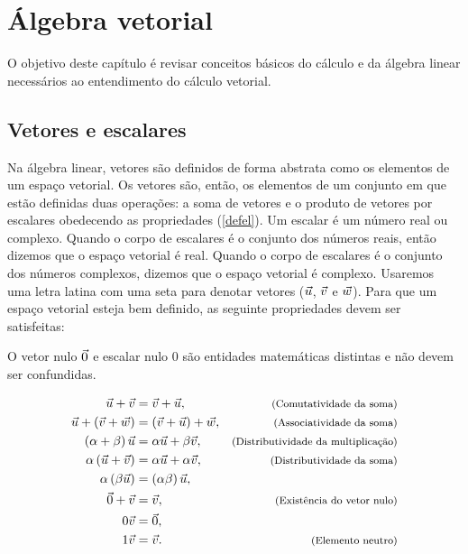 
\chapter{Álgebra vetorial}
O objetivo deste capítulo é revisar conceitos básicos do cálculo e da álgebra linear necessários ao entendimento do cálculo vetorial.    

\section{Vetores e escalares}
Na álgebra linear, vetores são definidos de forma abstrata como os elementos de um espaço vetorial. Os vetores são, então, os elementos de um conjunto em que estão definidas duas operações: a soma de vetores e o produto de vetores por escalares obedecendo as propriedades (\ref{defel}). Um escalar é um número real ou complexo. Quando o corpo de escalares é o conjunto dos números reais, então dizemos que o espaço vetorial é real. Quando o corpo de escalares é o conjunto dos números complexos, dizemos que o espaço vetorial é complexo. Usaremos uma letra latina com uma seta para denotar vetores ($\vec{u}$, $\vec{v}$ e $\vec{w}$).  Para que um espaço vetorial esteja bem definido, as seguinte propriedades devem ser satisfeitas:

\begin{obs} O vetor nulo $\vec{0}$ e escalar nulo $0$ são entidades matemáticas distintas e não devem ser confundidas.\end{obs}
\begin{subequations}\label{defel}
\begin{align}
\vec{u}+\vec{v}&=\vec{v}+\vec{u},&\hbox{\footnotesize (Comutatividade da soma)}\label{defelcom}\\
\vec{u}+\left(\vec{v}+\vec{w}\right)&=\left(\vec{v}+\vec{u}\right)+\vec{w},&\hbox{\footnotesize (Associatividade da soma)}\label{defelass}\\
\left(\alpha+\beta\right) \vec{u}&=\alpha\vec{u}+\beta\vec{v},&\hbox{\footnotesize (Distributividade da multiplicação)}\label{defeldist1}\\
\alpha \left(\vec{u}+\vec{v}\right)&= \alpha \vec{u}+\alpha\vec{v},&\hbox{\footnotesize (Distributividade da soma)}\label{defeldist2}\\
\alpha \left(\beta\vec{u}\right)&=\left(\alpha\beta\right)\vec{u},\label{defeldist3}\\
\vec{0}+\vec{v}&=\vec{v}, &\hbox{\footnotesize (Existência do vetor nulo)}\label{defelnulo}\\
0\vec{v}&=\vec{0},\label{defelnulo2}\\
1\vec{v}&=\vec{v}.&\hbox{\footnotesize (Elemento neutro)}\label{defelneutro}
\end{align}
\end{subequations}

